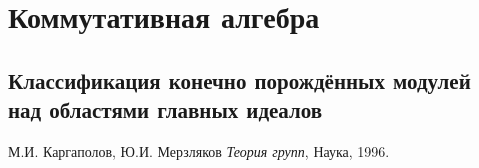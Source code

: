 \documentclass[12pt]{amsart}
\numberwithin{theorem}{subsection}
\theoremstyle{definition}
\begin{document}
\section{Коммутативная алгебра}

\subsection{Классификация конечно порождённых модулей над областями главных идеалов}







\begin{thebibliography}{2}
	
	 М.И. Каргаполов, Ю.И. Мерзляков {\it Теория групп}, Наука, 1996.
	

\end{thebibliography}
	
	

	
\end{document}
